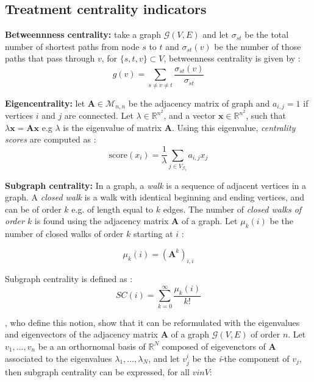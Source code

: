 \clearpage

\subsection{Treatment centrality indicators}
\label{sec:treatment_centrality_appendix}
\textbf{Betweennness centrality:} take a graph $\mathcal{G}(V,E)$ and let $\sigma_{st}$ be the total number of shortest paths from node $s$ to $t$ and $\sigma_{st}(v)$ be the number of those paths that pass through $v$, for $\{s,t,v\} \subset V$, betweenness centrality is given by :
\begin{equation}
g(v) = \sum_{s\neq v \neq t} \frac{\sigma_{st}(v)}{\sigma_{st}}
\end{equation}

\textbf{Eigencentrality:} let $\mathbf{A}\in \mathcal{M}_{n,n}$ be the adjacency matrix of graph and $a_{i,j}=1$ if vertices $i$ and $j$ are connected. Let $\lambda \in \mathbb{R}^{n^2}$, and a vector $\mathbf{x} \in \mathbb{R}^{n^2}$, such that $\lambda \mathbf{x} = \mathbf{Ax}$ e.g $\lambda$ is the eigenvalue of matrix $\mathbf{A}$. Using this eigenvalue, \textit{centrality scores} are computed as :
\begin{equation}
\text{score}(x_i)= \frac{1}{\lambda}\sum_{j \in V_{\mathcal{G}_t}} a_{i,j}x_j
\end{equation}

\textbf{Subgraph centrality:} In a graph, a \textit{walk} is a sequence of adjacent vertices in a graph. A \textit{closed walk} is a walk with identical beginning and ending vertices, and can be of order $k$ e.g. of length equal to $k$ edges. The number of \textit{closed walks of order $k$} is found using the adjacency matrix $\mathbf{A}$ of a graph. Let $\mu_k(i)$ be the number of closed walks of order $k$ starting at $i$ : 

$$
\mu_k(i) = (\mathbf{A}^k)_{i,i}
$$

Subgraph centrality is defined as : 
\begin{equation}
SC(i) = \sum_{k=0}^\infty \frac{\mu_k(i)}{k!}
\end{equation}

\cite{estrada_subgraph_2005}, who define this notion, show that it can be reformulated with the eigenvalues and eigenvectors of the adjacency matrix $\mathbf{A}$ of a graph $\mathcal{G}(V,E)$ of order $n$. Let $v_{1},...,v_{n}$ be a an orthornomal basis of $\mathbb{R}^N$ composed of eigevenctors of $\mathbf{A}$ associated to the eigenvalues $\lambda_1, ..., \lambda_N$, and let $v^i_j$ be the \textit{i}-the component of $v_j$, then subgraph centrality can be expressed, for all $v in V$:

